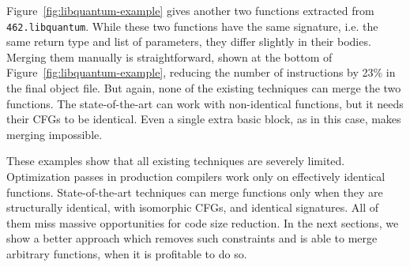 Figure~\ref{fig:libquantum-example} gives another two functions extracted from \texttt{462.libquantum}. While these two functions have the
same signature, i.e. the same return type and list of parameters, they differ slightly in their bodies. Merging them manually
is straightforward, shown at the bottom of Figure~\ref{fig:libquantum-example}, reducing the number of instructions by 23\% in the final object file. But again,
none of the existing techniques can merge the two functions. The state-of-the-art can work with non-identical functions, but it needs
their CFGs to be identical. Even a single extra basic block, as in this case, makes merging impossible.

These examples show that all existing techniques are severely limited. Optimization passes in production compilers work only on effectively
identical functions. State-of-the-art techniques can merge functions only when they are structurally identical, with isomorphic CFGs, and identical signatures. All of them miss massive opportunities for code size reduction. In the next sections, we show a better approach which
removes such constraints and is able to merge arbitrary functions, when it is profitable to do so.
